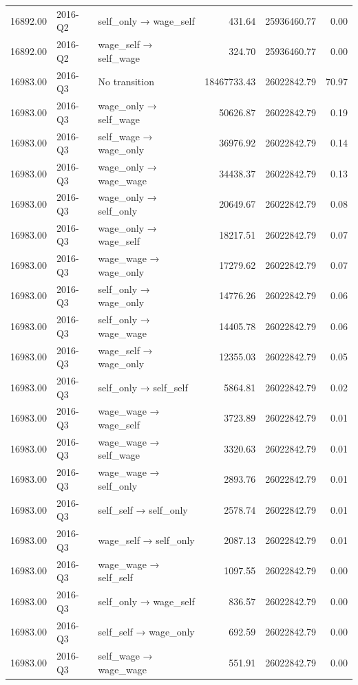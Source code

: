 \begin{table}[ht]
{\begin{tabular}{rllrrr}
  16892.00 & 2016-Q2 & self\_only → wage\_self & 431.64 & 25936460.77 & 0.00 \\ 
  16892.00 & 2016-Q2 & wage\_self → self\_wage & 324.70 & 25936460.77 & 0.00 \\ 
  16983.00 & 2016-Q3 & No transition & 18467733.43 & 26022842.79 & 70.97 \\ 
  16983.00 & 2016-Q3 & wage\_only → self\_wage & 50626.87 & 26022842.79 & 0.19 \\ 
  16983.00 & 2016-Q3 & self\_wage → wage\_only & 36976.92 & 26022842.79 & 0.14 \\ 
  16983.00 & 2016-Q3 & wage\_only → wage\_wage & 34438.37 & 26022842.79 & 0.13 \\ 
  16983.00 & 2016-Q3 & wage\_only → self\_only & 20649.67 & 26022842.79 & 0.08 \\ 
  16983.00 & 2016-Q3 & wage\_only → wage\_self & 18217.51 & 26022842.79 & 0.07 \\ 
  16983.00 & 2016-Q3 & wage\_wage → wage\_only & 17279.62 & 26022842.79 & 0.07 \\ 
  16983.00 & 2016-Q3 & self\_only → wage\_only & 14776.26 & 26022842.79 & 0.06 \\ 
  16983.00 & 2016-Q3 & self\_only → wage\_wage & 14405.78 & 26022842.79 & 0.06 \\ 
  16983.00 & 2016-Q3 & wage\_self → wage\_only & 12355.03 & 26022842.79 & 0.05 \\ 
  16983.00 & 2016-Q3 & self\_only → self\_self & 5864.81 & 26022842.79 & 0.02 \\ 
  16983.00 & 2016-Q3 & wage\_wage → wage\_self & 3723.89 & 26022842.79 & 0.01 \\ 
  16983.00 & 2016-Q3 & wage\_wage → self\_wage & 3320.63 & 26022842.79 & 0.01 \\ 
  16983.00 & 2016-Q3 & wage\_wage → self\_only & 2893.76 & 26022842.79 & 0.01 \\ 
  16983.00 & 2016-Q3 & self\_self → self\_only & 2578.74 & 26022842.79 & 0.01 \\ 
  16983.00 & 2016-Q3 & wage\_self → self\_only & 2087.13 & 26022842.79 & 0.01 \\ 
  16983.00 & 2016-Q3 & wage\_wage → self\_self & 1097.55 & 26022842.79 & 0.00 \\ 
  16983.00 & 2016-Q3 & self\_only → wage\_self & 836.57 & 26022842.79 & 0.00 \\ 
  16983.00 & 2016-Q3 & self\_self → wage\_only & 692.59 & 26022842.79 & 0.00 \\ 
  16983.00 & 2016-Q3 & self\_wage → wage\_wage & 551.91 & 26022842.79 & 0.00 \\ 

\end{tabular}}
\end{table}

